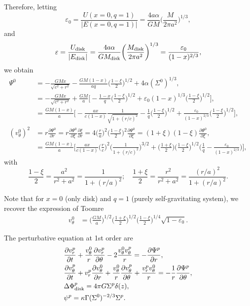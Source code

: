 \documentclass[11pt]{article}
\newcommand{\vr}{v_{r}}
\newcommand{\vt}{v_{\theta}}
\newcommand{\Phid}{\Phi_{\rm{disk}}}
\newcommand{\Md}{M_{\rm{disk}}}
\begin{document}
Therefore, letting  $$\varepsilon_0 = \frac{U(x=0,q=1)}{|E(x=0,q=1)|} =\frac{4a \alpha }{GM} \bigg(\frac{M}{2\pi a^2}\bigg)^{1/3},$$
and
$$\varepsilon = \frac{U_{\mathrm{disk}}}{|E_{\mathrm{disk}}|} =\frac{4a \alpha }{G\Md} \bigg(\frac{\Md}{2\pi a^2}\bigg)^{1/3} =  \frac{\varepsilon_0}{(1-x)^{2/3}},$$  
we obtain
\begin{align}
\Psi^0 &=  - \frac{G M x}{\sqrt{c^2+r^2}}-\frac{G M (1-x)}{a q}\bigg(\frac{1-\xi}{2}\bigg)^{1/2} + 4\alpha  (\Sigma^0)^{1/3} ,\\
{}&=  -\frac{G M x}{\sqrt{c^2+r^2}}+\frac{G M }{a} \bigg[-\frac{1-x}{q}\bigg(\frac{1-\xi}{2}\bigg)^{1/2} + \varepsilon_0 (1-x)^{1/3}\bigg(\frac{1-\xi}{2}\bigg)^{1/2} \bigg] ,\\
&=  \frac{G M(1-x)}{a}\bigg[-\frac{ ax}{c(1-x)}\frac{1}{ \sqrt{1+(r/c)^2}} - \frac{1}{q} \bigg(\frac{1-\xi}{2}\bigg)^{1/2} + \frac{\varepsilon_0 }{ (1-x)^{2/3}}\bigg(\frac{1-\xi}{2}\bigg)^{1/2} \bigg],\\
(\vt^0)^2 &= r \frac{\partial \Psi^0}{\partial r} =r \frac{\partial \Psi^0}{\partial \xi} \frac{\partial \xi}
{\partial r} = 4\bigg(\frac{r}{a}\bigg)^2    \bigg(\frac{1-\xi}{2}\bigg)^2 \frac{\partial \Psi^0}{\partial \xi}= (1+\xi) (1-\xi) \frac{\partial \Psi^0}{\partial \xi}  ,\\
&=\frac{GM(1-x)}{a}\bigg[\frac{ax}{c(1-x)}\bigg( \frac{r}{c}\bigg)^2 \bigg(\frac{1}{1+(r/c)^2}\bigg)^{3/2} 
+ \bigg(\frac{1+\xi}{2}\bigg) \bigg(\frac{1-\xi}{2}\bigg)^{1/2} \bigg(\frac{1}{q}-  \frac{\varepsilon_0}{ (1-x)^{2/3}}   \bigg)\bigg], 
\end{align}
with
$$\frac{1-\xi}{2}= \frac{a^2}{r^2+a^2}= \frac{1}{1+(r/a)^2}; \quad \frac{1+\xi}{2}= \frac{r^2}{r^2+a^2}= \frac{(r/a)^2}{1+(r/a)^2}.$$

Note that for $x=0$ (only disk) and $q=1$ (purely self-gravitating system), we recover the expression of Toomre
\begin{align}
\vt^0 &=\bigg(\frac{GM}{a} \bigg)^{1/2}\bigg(\frac{1+\xi}{2}\bigg)^{1/2} \bigg(\frac{1-\xi}{2}\bigg)^{1/4}  \sqrt{1- \varepsilon_0 } .
\end{align}

The perturbative equation at 1st order are
\begin{align}
&\frac{\partial \vr^p}{\partial t} + \frac{\vt^0}{r} \frac{\partial \vr^p}{\partial \theta} - 2\frac{\vt^0 \vt^p}{r} = -\frac{\partial \Psi^p}{\partial r} ,\\
&\frac{\partial \vt^p}{\partial t} + \vr^p \frac{\partial \vt^0}{\partial r} + \frac{\vt^0}{r} \frac{\partial \vt^p}{\partial \theta} + \frac{\vr^p\vt^0}{r} = -\frac{1}{r}\frac{\partial \Psi^p}{\partial \theta} ,\\
& \Delta \Phid^p = 4\pi G  \Sigma^p \delta (z), \\
& \psi^p =  \kappa \Gamma  (\Sigma^0)^{-2/3} \Sigma^p .
\end{align}
\end{document}
